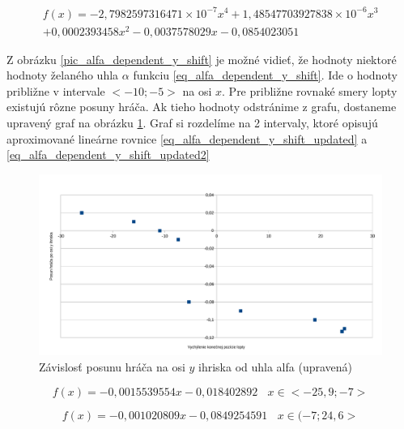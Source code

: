 \begin{eqnarray}\label{eq_alfa_dependent_y_shift}
 f(x) =  - 2,7982597316471 \times 10^{-7}x^4 + 1,48547703927838\times 10^{-6}x^3 \\ \nonumber
 + 0,0002393458x^2 - 0,0037578029x - 0,0854023051
\end{eqnarray}


Z obrázku \ref{pic_alfa_dependent_y_shift} je možné vidieť, že hodnoty niektoré hodnoty želaného uhla $\alpha$  funkciu \ref{eq_alfa_dependent_y_shift}. Ide o hodnoty približne v intervale $<-10;-5>$ na osi $x$. Pre približne rovnaké smery lopty existujú rôzne posuny hráča. Ak tieho hodnoty odstránime z grafu, dostaneme upravený graf na obrázku \ref{pic_alfa_dependent_y_shift_updated}. Graf si rozdelíme na 2 intervaly, ktoré opisujú aproximované lineárne rovnice \ref{eq_alfa_dependent_y_shift_updated} a \ref{eq_alfa_dependent_y_shift_updated2}

\begin{figure}[H]
	\centering
	\includegraphics[scale=0.5]{./data/alfa_dependent_y_shift_updated}
	\caption{Závislosť posunu hráča na osi $y$ ihriska od uhla alfa (upravená)}
	\label{pic_alfa_dependent_y_shift_updated}
\end{figure}


\begin{equation} \label{eq_alfa_dependent_y_shift_updated}
 f(x) = -0,0015539554x - 0,018402892~~~~ x \in <-25,9;-7>
\end{equation}

\begin{equation} \label{eq_alfa_dependent_y_shift_updated2}
 f(x) = -0,001020809x - 0,0849254591 ~~~~ x \in(-7;24,6>
\end{equation}


